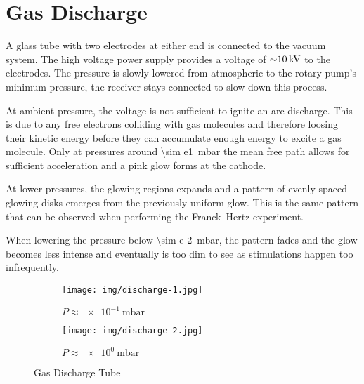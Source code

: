 \chapter{Gas Discharge}

A glass tube with two electrodes at either end is connected to the vacuum system.
The high voltage power supply provides a voltage of $\SI{\sim10}{\kV}$ to the electrodes.
The pressure is slowly lowered from atmospheric to the rotary pump's minimum pressure, the receiver stays connected to slow down this process.

At ambient pressure, the voltage is not sufficient to ignite an arc discharge.
This is due to any free electrons colliding with gas molecules and therefore loosing their kinetic energy  before they can accumulate enough energy to excite a gas molecule.
Only at pressures around \SI{\sim e1}{\milli\bar} the mean free path allows for sufficient acceleration and a pink glow forms at the cathode.

At lower pressures, the glowing regions expands and a pattern of evenly spaced glowing disks emerges from the previously uniform glow.
This is the same pattern that can be observed when performing the Franck–Hertz experiment.

When lowering the pressure below \SI{\sim e-2}{\milli\bar}, the pattern fades and the glow becomes less intense and eventually is too dim to see as stimulations happen too infrequently.

\begin{figure}[b!]
	\begin{subfigure}{.45\textwidth}
		\centering
		\texttt{[image: img/discharge-1.jpg]}
		\caption{$P \approx \SI{e-1}{\milli\bar}$}
	\end{subfigure}
	\begin{subfigure}{.45\textwidth}
		\centering
		\texttt{[image: img/discharge-2.jpg]}
		\caption{$P \approx \SI{e0}{\milli\bar}$}
	\end{subfigure}
	\caption{Gas Discharge Tube}
\end{figure}
